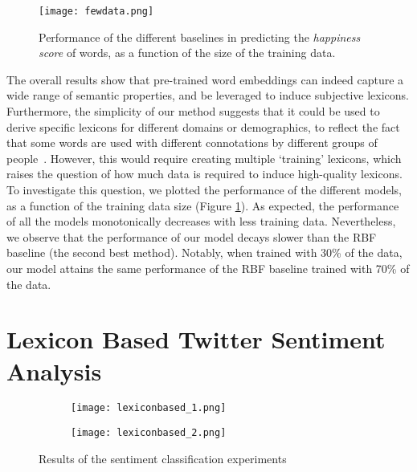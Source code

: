 \documentclass[letterpaper]{article}
\begin{document}
\begin{figure}[htb]
\centering
\texttt{[image: fewdata.png]}
\caption{Performance of the different baselines in predicting the \textit{happiness score} of words, as a function of the size of the training data.}
\label{fig:fewdata}
\end{figure}

The overall results show that pre-trained word embeddings can indeed capture a wide range of semantic properties, and be leveraged to induce subjective lexicons. Furthermore, the simplicity of our method suggests that it could be used to derive specific lexicons for different domains or demographics, to reflect the fact that some words are used with different connotations by different groups of people~\cite{yang2015putting}. However, this would require creating multiple `training' lexicons, which raises the question of how much data is required to induce high-quality lexicons. To investigate this question, we plotted the performance of the different models, as a function of the training data size (Figure \ref{fig:fewdata}). As expected, the performance of all the models monotonically decreases with less training data. Nevertheless, we observe that the performance of our model decays slower than the RBF baseline (the second best method). Notably, when trained with 30\% of the data, our model attains the same performance of the RBF baseline trained with 70\% of the data.

\section{Lexicon Based Twitter Sentiment Analysis}

\begin{figure*}[tb]
\centering
\begin{subfigure}{.49\linewidth}
  \centering
  \texttt{[image: lexiconbased\_1.png]}
\label{fig:lexicons}
\end{subfigure}%
\hfill
\begin{subfigure}{.49\linewidth}
  \centering
\texttt{[image: lexiconbased\_2.png]}
  \label{fig:lex_vs_svm}
\end{subfigure}
\caption{Results of the sentiment classification experiments}
\label{fig:classification}
\end{figure*}
\end{document}
